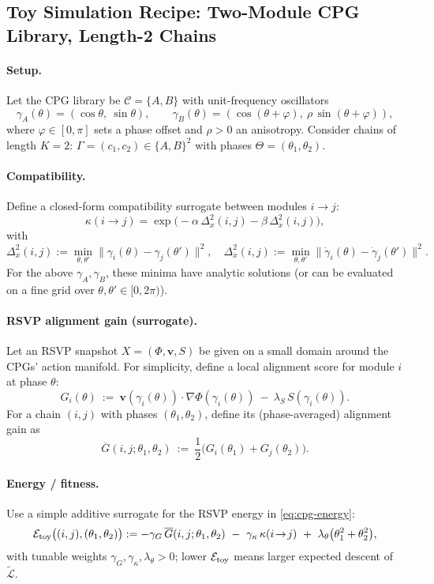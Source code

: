 \documentclass[a4paper,11pt]{article}
\begin{document}
\subsection{Toy Simulation Recipe: Two-Module CPG Library, Length-2 Chains}
\label{sec:cpg-sim}

\paragraph{Setup.}
Let the CPG library be $\mathcal{C}=\{A,B\}$ with unit-frequency oscillators
\[
\gamma_A(\theta)=(\cos\theta,\ \sin\theta),\qquad
\gamma_B(\theta)=(\cos(\theta+\varphi),\ \rho\,\sin(\theta+\varphi)),
\]
where $\varphi\in[0,\pi]$ sets a phase offset and $\rho>0$ an anisotropy.
Consider chains of length $K=2$: $\Gamma=(c_1,c_2)\in\{A,B\}^2$ with phases
$\Theta=(\theta_1,\theta_2)$.

\paragraph{Compatibility.}
Define a closed-form compatibility surrogate between modules $i\to j$:
\[
\kappa(i\!\to\! j)=\exp\!\Big(-\alpha\,\Delta_{x}^2(i,j)-\beta\,\Delta_{\dot{x}}^2(i,j)\Big),
\]
with
\[
\Delta_{x}^2(i,j):=\min_{\theta,\theta'}\|\gamma_i(\theta)-\gamma_j(\theta')\|^2,\quad
\Delta_{\dot{x}}^2(i,j):=\min_{\theta,\theta'}\|\dot\gamma_i(\theta)-\dot\gamma_j(\theta')\|^2.
\]
For the above $\gamma_A,\gamma_B$, these minima have analytic solutions (or can
be evaluated on a fine grid over $\theta,\theta'\in[0,2\pi)$).

\paragraph{RSVP alignment gain (surrogate).}
Let an RSVP snapshot $X=(\Phi,\mathbf v,S)$ be given on a small domain around
the CPGs’ action manifold. For simplicity, define a local alignment score
for module $i$ at phase $\theta$:
\[
G_i(\theta)\ :=\ \mathbf v(\gamma_i(\theta))\cdot \nabla\Phi(\gamma_i(\theta))\ -\ \lambda_S\,S(\gamma_i(\theta)).
\]
For a chain $(i,j)$ with phases $(\theta_1,\theta_2)$, define its (phase-averaged)
alignment gain as
\[
\overline{G}(i,j;\theta_1,\theta_2)\ :=\
\frac{1}{2}\Big( G_i(\theta_1)+G_j(\theta_2)\Big).
\]

\paragraph{Energy / fitness.}
Use a simple additive surrogate for the RSVP energy in \eqref{eq:cpg-energy}:
\begin{equation}
\label{eq:toy-energy}
\mathcal{E}_{\rm toy}\big((i,j),(\theta_1,\theta_2)\big)
:= -\gamma_G\,\overline{G}(i,j;\theta_1,\theta_2)\ -\ \gamma_\kappa\,\kappa(i\!\to\! j)\ +\ \lambda_\theta\big(\theta_1^2+\theta_2^2\big),
\end{equation}
with tunable weights $\gamma_G,\gamma_\kappa,\lambda_\theta>0$; lower
$\mathcal{E}_{\rm toy}$ means larger expected descent of $\widetilde{\mathcal{L}}$.
\end{document}
